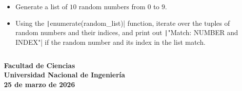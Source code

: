 \begin{questions}
	\begin{itemize}
		\item

		      Generate a list of $10$ random numbers from $0$ to $9$.

		\item

		      Using the \texttt|enumerate(random_list)|
		      function, iterate over the tuples of random numbers and
		      their indices, and print out
		      \texttt|"Match: NUMBER and INDEX"| if the random
		      number and its index in the list match.
	\end{itemize}
	\inputminted[fontsize=\tiny,linenos]{python}{q3.py}

\end{questions}
\vfill
\begin{flushright}\bfseries
	Facultad de Ciencias\\[2mm]
	Universidad Nacional de Ingeniería\\[2mm]
	25 de marzo de 2026
\end{flushright}


